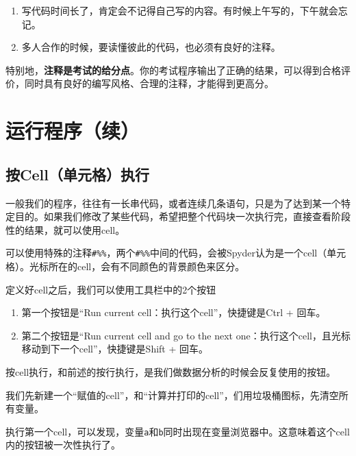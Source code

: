 \documentclass[
]{book}
\providecommand{\tightlist}{%
  \setlength{\itemsep}{0pt}\setlength{\parskip}{0pt}}
\begin{document}
\begin{enumerate}
\def\labelenumi{\arabic{enumi}.}
\tightlist
\item
  写代码时间长了，肯定会不记得自己写的内容。有时候上午写的，下午就会忘记。
\item
  多人合作的时候，要读懂彼此的代码，也必须有良好的注释。
\end{enumerate}

特别地，\textbf{注释是考试的给分点}。你的考试程序输出了正确的结果，可以得到合格评价，同时具有良好的编写风格、合理的注释，才能得到更高分。

\hypertarget{ux8fd0ux884cux7a0bux5e8fux7eed}{%
\section{运行程序（续）}\label{ux8fd0ux884cux7a0bux5e8fux7eed}}

\hypertarget{ux6309cellux5355ux5143ux683cux6267ux884c}{%
\subsection{按Cell（单元格）执行}\label{ux6309cellux5355ux5143ux683cux6267ux884c}}

一般我们的程序，往往有一长串代码，或者连续几条语句，只是为了达到某一个特定目的。如果我们修改了某些代码，希望把整个代码块一次执行完，直接查看阶段性的结果，就可以使用cell。

可以使用特殊的注释\texttt{\#\%\%}，两个\texttt{\#\%\%}中间的代码，会被Spyder认为是一个cell（单元格）。光标所在的cell，会有不同颜色的背景颜色来区分。

定义好cell之后，我们可以使用工具栏中的2个按钮

\begin{enumerate}
\def\labelenumi{\arabic{enumi}.}
\tightlist
\item
  第一个按钮是``Run current cell：执行这个cell''，快捷键是Ctrl + 回车。
\item
  第二个按钮是``Run current cell and go to the next one：执行这个cell，且光标移动到下一个cell''，快捷键是Shift + 回车。
\end{enumerate}

按cell执行，和前述的按行执行，是我们做数据分析的时候会反复使用的按钮。

我们先新建一个``赋值的cell''，和``计算并打印的cell''，们用垃圾桶图标，先清空所有变量。

执行第一个cell，可以发现，变量\texttt{a}和\texttt{b}同时出现在变量浏览器中。这意味着这个cell内的按钮被一次性执行了。
\end{document}
